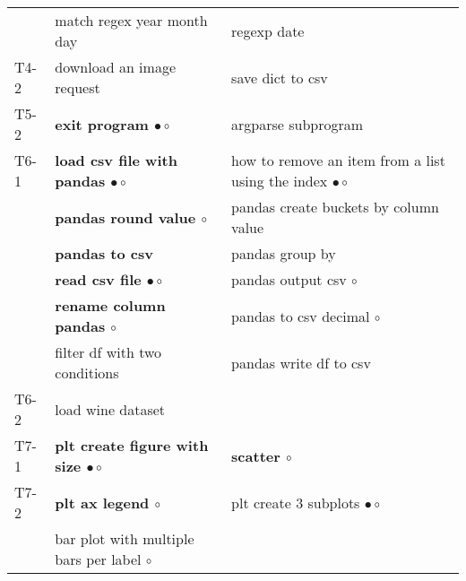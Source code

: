 \begin{longtable}{lLL}
& match regex year month day & regexp date \\
T4-2 & download an image request & save dict to csv \\
T5-2 & \textbf{exit program $\bullet\circ$} & argparse subprogram \\
T6-1 & \textbf{load csv file with pandas $\bullet\circ$} & how to remove an item from a list using the index $\bullet\circ$ \\
& \textbf{pandas round value $\circ$} & pandas create buckets by column value \\
& \textbf{pandas to csv} & pandas group by \\
& \textbf{read csv file $\bullet\circ$} & pandas output csv $\circ$ \\
& \textbf{rename column pandas $\circ$} & pandas to csv decimal $\circ$ \\
& filter df with two conditions & pandas write df to csv \\
T6-2 & load wine dataset \\
T7-1 & \textbf{plt create figure with size $\bullet\circ$} & \textbf{scatter $\circ$} \\
T7-2 & \textbf{plt ax legend $\circ$} & plt create 3 subplots $\bullet\circ$ \\
& bar plot with multiple bars per label $\circ$ \\

\bottomrule
\end{longtable}
